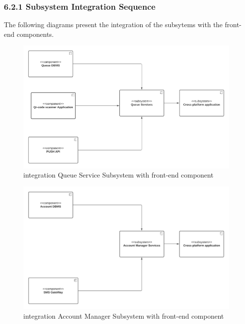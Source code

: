 \subsubsection{6.2.1 Subsystem Integration Sequence}
\label{subsect: subsytemintegrationsequence}

The following diagrams present the integration of the subsytems with the front-end components.

\begin{figure}[h!]
    \centering
    \includegraphics[width=1\textwidth]{Images/Test Diagram/view.png}
    \caption{\label{fig:viewQueue}{integration Queue Service Subsystem with front-end component}}
\end{figure} 
\begin{figure}[h!]
    \centering
    \includegraphics[width=1\textwidth]{Images/Test Diagram/viewAccount.png}
    \caption{\label{fig:viewAccount}{integration Account Manager Subsystem with front-end component}}
\end{figure} 
